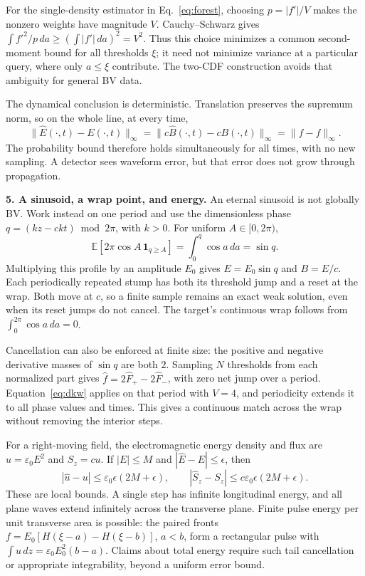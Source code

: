 \documentclass[11pt,letterpaper]{article}
\newcommand{\ind}{\mathbf1}
\begin{document}
For the single-density estimator in Eq.~\eqref{eq:forest}, choosing
$p=|f'|/V$ makes the nonzero weights have magnitude $V$.
Cauchy--Schwarz gives $\int f'^2/p\,da\ge(\int|f'|\,da)^2=V^2$.
Thus this choice minimizes a common second-moment bound for all thresholds
$\xi$; it need not minimize variance at a particular query, where only $a\le\xi$
contribute. The two-CDF construction avoids that ambiguity for general BV data.

The dynamical conclusion is deterministic. Translation preserves the supremum
norm, so on the whole line, at every time,
\begin{equation}
 \|\widehat E(\cdot,t)-E(\cdot,t)\|_\infty
 =\|c\widehat B(\cdot,t)-cB(\cdot,t)\|_\infty
 =\|\widehat f-f\|_\infty.
 \label{eq:transporterror}
\end{equation}
The probability bound therefore holds simultaneously for all times, with no
new sampling. A detector sees waveform error, but that error does not grow
through propagation.

\textbf{5. A sinusoid, a wrap point, and energy.}
An eternal sinusoid is not globally BV. Work instead on one period and use the
dimensionless phase $q=(kz-ckt)\bmod 2\pi$, with $k>0$. For uniform
$A\in[0,2\pi)$,
\begin{equation}
 \mathbb E[2\pi\cos A\,\ind_{q\ge A}]
 =\int_0^q\cos a\,da=\sin q.
 \label{eq:sine}
\end{equation}
Multiplying this profile by an amplitude $E_0$ gives
$E=E_0\sin q$ and $B=E/c$. Each periodically repeated stump has both its
threshold jump and a reset at the wrap. Both move at $c$, so a finite sample
remains an exact weak solution, even when its reset jumps do not cancel.
The target's continuous wrap follows from $\int_0^{2\pi}\cos a\,da=0$.

Cancellation can also be enforced at finite size: the positive and negative
derivative masses of $\sin q$ are both $2$. Sampling $N$ thresholds from each
normalized part gives $\widehat f=2\widehat F_+-2\widehat F_-$, with zero
net jump over a period. Equation~\eqref{eq:dkw} applies on that period with
$V=4$, and periodicity extends it to all phase values and times.
This gives a continuous match across the wrap without removing the interior steps.

For a right-moving field, the electromagnetic energy density and flux are
$u=\varepsilon_0E^2$ and $S_z=cu$. If $|E|\le M$ and
$|\widehat E-E|\le\epsilon$, then
\begin{equation}
 |\widehat u-u|\le\varepsilon_0\epsilon(2M+\epsilon),\qquad
 |\widehat S_z-S_z|\le c\varepsilon_0\epsilon(2M+\epsilon).
\end{equation}
These are local bounds. A single step has infinite longitudinal energy, and
all plane waves extend infinitely across the transverse plane. Finite pulse
energy per unit transverse area is possible: the paired fronts
$f=E_0[H(\xi-a)-H(\xi-b)]$, $a<b$, form a rectangular pulse with
$\int u\,dz=\varepsilon_0E_0^2(b-a)$. Claims about total energy require such
tail cancellation or appropriate integrability, beyond a uniform error bound.
\end{document}
